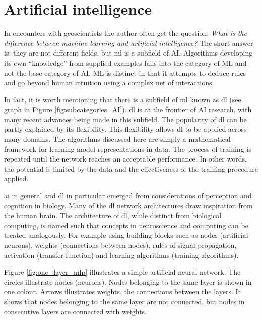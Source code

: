 \section{Artificial intelligence}

In encounters with geoscientists the author often get the question: \textit{What is the difference between machine learning and artificial intelligence?} The short answer is: they are not different fields, but \acrshort{ml} is a subfield of AI. Algorithms developing its own ``knowledge'' from supplied examples falls into the category of ML and not the base category of AI. ML is distinct in that it attempts to deduce rules and go beyond human intuition using a complex net of interactions. 

In fact, it is worth mentioning that there is a subfield of \acrshort{ml} known as \acrshort{dl} (see graph in Figure \ref{fig:subcategories_AI}). %
\acrshort{dl} is at the frontier of AI research, with many recent advances being made in this subfield. The popularity of \acrshort{dl} can be partly explained by its flexibility. This flexibility allows \acrshort{dl} to be applied across many domains. The algorithms discussed here are simply a mathematical framework for learning model representations in data. The process of training is repeated until the network reaches an acceptable performance. In other words, the potential is limited by the data and the effectiveness of the training procedure applied.


\acrshort{ai} in general and \acrshort{dl} in particular emerged from considerations of perception and cognition in biology. Many of the \acrshort{dl} network architectures draw inspiration from the human brain. The architecture of \acrshort{dl}, while distinct from biological computing, is named such that concepts in neuroscience and computing can be treated analogously. For example using building blocks such as nodes (artificial neurons), weights (connections between nodes), rules of signal propagation, activation (transfer function) and learning algorithms (training algorithms).

Figure \ref{fig:one_layer_mlp} illustrates a simple artificial neural network. The circles illustrate nodes (neurons). Nodes belonging to the same layer is shown in one colour. Arrows illustrates weights, the connections between the layers. It shows that nodes belonging to the same layer are not connected, but nodes in consecutive layers are connected with weights. 

